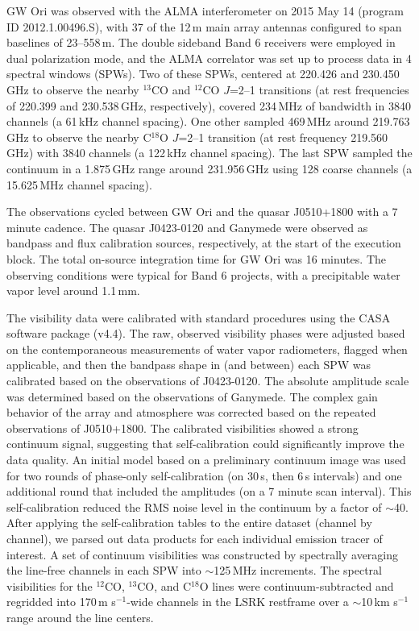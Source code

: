 \documentclass[twocolumn]{aastex61}
\begin{document}
GW Ori was observed with the ALMA interferometer on 2015 May 14 (program ID 2012.1.00496.S), with 37 of the 12\,m main array antennas configured to span baselines of 23--558\,m.  The double sideband Band 6 receivers were employed in dual polarization mode, and the ALMA correlator was set up to process data in 4 spectral windows (SPWs).  Two of these SPWs, centered at 220.426 and 230.450\,GHz to observe the nearby $^{13}$CO and $^{12}$CO $J$=2--1 transitions (at rest frequencies of 220.399 and 230.538\,GHz, respectively), covered 234\,MHz of bandwidth in 3840 channels (a 61\,kHz channel spacing).  One other sampled 469\,MHz around 219.763\,GHz to observe the nearby C$^{18}$O $J$=2--1 transition (at rest frequency 219.560\,GHz) with 3840 channels (a 122\,kHz channel spacing).  The last SPW sampled the continuum in a 1.875\,GHz range around 231.956\,GHz using 128 coarse channels (a 15.625\,MHz channel spacing).

The observations cycled between GW Ori and the quasar J0510+1800 with a 7 minute cadence.  The quasar J0423-0120 and Ganymede were observed as bandpass and flux calibration sources, respectively, at the start of the execution block.  The total on-source integration time for GW Ori was 16 minutes.  The observing conditions were typical for Band 6 projects, with a precipitable water vapor level around 1.1\,mm.

The visibility data were calibrated with standard procedures using the {\sc CASA} software package (v4.4).  The raw, observed visibility phases were adjusted based on the contemporaneous measurements of water vapor radiometers, flagged when applicable, and then the bandpass shape in (and between) each SPW was calibrated based on the observations of J0423-0120.  The absolute amplitude scale was determined based on the observations of Ganymede.  The complex gain behavior of the array and atmosphere was corrected based on the repeated observations of J0510+1800.  The calibrated visibilities showed a strong continuum signal, suggesting that self-calibration could significantly improve the data quality.  An initial model based on a preliminary continuum image was used for two rounds of phase-only self-calibration (on 30\,s, then 6\,s intervals) and one additional round that included the amplitudes (on a 7 minute scan interval).  This self-calibration reduced the RMS noise level in the continuum by a factor of $\sim$40.  After applying the self-calibration tables to the entire dataset (channel by channel),  we parsed out data products for each individual emission tracer of interest.  A set of continuum visibilities was constructed by spectrally averaging the line-free channels in each SPW into $\sim$125\,MHz increments.  The spectral visibilities for the $^{12}$CO, $^{13}$CO, and C$^{18}$O lines were continuum-subtracted and regridded into 170\,m s$^{-1}$-wide channels in the LSRK restframe over a $\sim$10\,km s$^{-1}$ range around the line centers.
\end{document}
